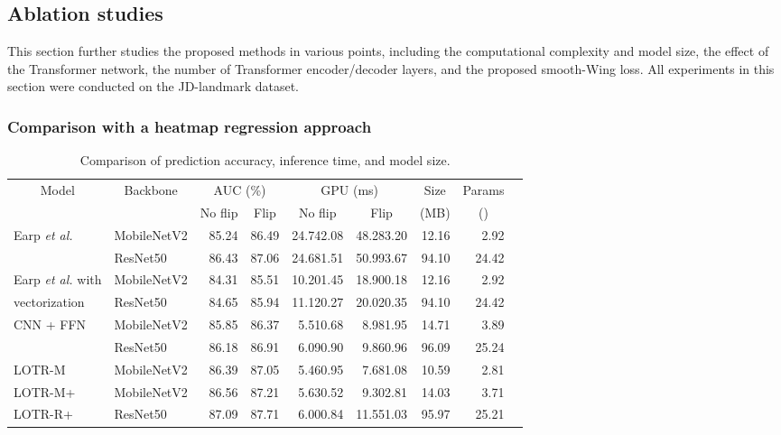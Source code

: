 \documentclass[journal]{IEEEtran}
\begin{document}
\subsection{Ablation studies}\label{subsec:ablation}

This section further studies the proposed methods in various points, including the computational complexity and model size, the effect of the Transformer network, the number of Transformer encoder/decoder layers, and the proposed smooth-Wing loss. 
All experiments in this section were conducted on the JD-landmark dataset.
\subsubsection{Comparison with a heatmap regression approach}\label{subsubsec:time}

\begin{table*}
\caption{Comparison of prediction accuracy, inference time, and model size.}
\centering
\begin{tabular}{llrrrrrrr}
\hline
\multicolumn{1}{c}{Model} &
\multicolumn{1}{c}{Backbone} &
\multicolumn{2}{c}{AUC (\%)} &
\multicolumn{2}{c}{GPU (ms)} &
\multicolumn{1}{c}{Size} &
\multicolumn{1}{c}{Params} \\
\cline{3-6}
& 
&
\multicolumn{1}{c}{No flip} &
\multicolumn{1}{c}{Flip} &
\multicolumn{1}{c}{No flip} &
\multicolumn{1}{c}{Flip} &
\multicolumn{1}{c}{(MB)} &
\multicolumn{1}{c}{()}\\
\hline
Earp \textit{et al.} \cite{earp2021sub}   & MobileNetV2 & 85.24 & 86.49 & 24.742.08 & 48.283.20 & 12.16 &  2.92  \\
                     & ResNet50          & 86.43 & 87.06 & 24.681.51 & 50.993.67 & 94.10 & 24.42 \\  
\hline
Earp \textit{et al.} \cite{earp2021sub} with   & MobileNetV2 & 84.31 & 85.51 & 10.201.45 & 18.900.18 & 12.16 & 2.92  \\
vectorization  & ResNet50          & 84.65 & 85.94 & 11.120.27 & 20.020.35 & 94.10 & 24.42  \\  
\hline  
CNN + FFN & MobileNetV2 & 85.85 & 86.37 & 5.510.68 & 8.981.95 & 14.71 & 3.89 \\
    & ResNet50            & 86.18 & 86.91 & 6.090.90 & 9.860.96 & 96.09 & 25.24  \\
\hline  
LOTR-M & MobileNetV2  & 86.39 & 87.05 & 5.460.95 & 7.681.08  & 10.59 &  2.81 \\  
LOTR-M+ & MobileNetV2 & 86.56 & 87.21 & 5.630.52 & 9.302.81  & 14.03 &  3.71 \\ 
LOTR-R+ & ResNet50          & 87.09 & 87.71 & 6.000.84 & 11.551.03 & 95.97 & 25.21 \\ 
\hline
\end{tabular}
\par
\label{tab:TimeAndSize}
\end{table*}
\end{document}
